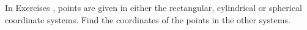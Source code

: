 {\noindent In Exercises} 
{,  points are given in either the rectangular, cylindrical or spherical coordinate systems. Find the coordinates of the points in the other systems.
}
